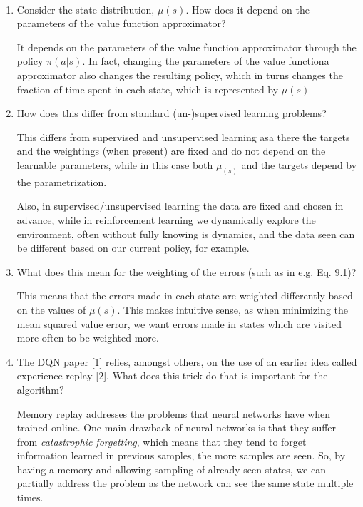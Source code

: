\documentclass{exam}
\begin{document}
\begin{problem}
\ \newline

\begin{enumerate}
    \item Consider the state distribution, $\mu(s)$. How does it depend on the parameters of the value function approximator?
            \begin{solutionorlines}[2in]
                It depends on the parameters of the value function approximator through the policy $\pi(a| s)$. In fact, changing the parameters of the value functiona approximator also changes the resulting policy, which in turns changes the fraction of time spent in each state, which is represented by $\mu(s)$
            \end{solutionorlines}
    \item How does this differ from standard (un-)supervised learning problems?
            \begin{solutionorlines}[2in]
                This differs from supervised and unsupervised learning asa there the targets and the weightings (when present) are fixed and do not depend on the learnable parameters, while in this case both $\mu_(s)$ and the targets depend by the parametrization. 
                
                Also, in supervised/unsupervised learning the data are fixed and chosen in advance, while in reinforcement learning we dynamically explore the environment, often without fully knowing is dynamics, and the data seen can be different based on our current policy, for example. 
            \end{solutionorlines}
    \item What does this mean for the weighting of the errors (such as in e.g. Eq. 9.1)?
            \begin{solutionorlines}[2in]
                This means that the errors made in each state are weighted differently based on the values of $\mu(s)$. This makes intuitive sense, as when minimizing the mean squared value error, we want errors made in states which are visited more often to be weighted more.
            \end{solutionorlines}
    \item The DQN paper [1] relies, amongst others, on the use of an earlier idea called experience replay [2]. What does this trick do that is important for the algorithm?
            \begin{solutionorlines}[2in]
                Memory replay addresses the problems that neural networks have when trained online. One main drawback of neural networks is that they suffer from \textit{catastrophic forgetting}, which means that they tend to forget information learned in previous samples, the more samples are seen. So, by having a memory and allowing sampling of already seen states, we can partially address the problem as the network can see the same state multiple times. 
                

\end{solutionorlines}
\end{enumerate}
\end{problem}
\end{document}
